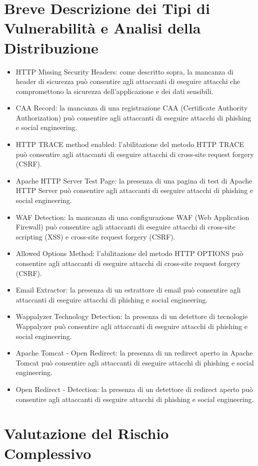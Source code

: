 \section{Breve Descrizione dei Tipi di Vulnerabilità e Analisi della Distribuzione}
\begin{itemize}
\item HTTP Missing Security Headers: come descritto sopra, la mancanza di header di sicurezza può consentire agli attaccanti di eseguire attacchi che compromettono la sicurezza dell'applicazione e dei dati sensibili.
\item CAA Record: la mancanza di una registrazione CAA (Certificate Authority Authorization) può consentire agli attaccanti di eseguire attacchi di phishing e social engineering.
\item HTTP TRACE method enabled: l'abilitazione del metodo HTTP TRACE può consentire agli attaccanti di eseguire attacchi di cross-site request forgery (CSRF).
\item Apache HTTP Server Test Page: la presenza di una pagina di test di Apache HTTP Server può consentire agli attaccanti di eseguire attacchi di phishing e social engineering.
\item WAF Detection: la mancanza di una configurazione WAF (Web Application Firewall) può consentire agli attaccanti di eseguire attacchi di cross-site scripting (XSS) e cross-site request forgery (CSRF).
\item Allowed Options Method: l'abilitazione del metodo HTTP OPTIONS può consentire agli attaccanti di eseguire attacchi di cross-site request forgery (CSRF).
\item Email Extractor: la presenza di un estrattore di email può consentire agli attaccanti di eseguire attacchi di phishing e social engineering.
\item Wappalyzer Technology Detection: la presenza di un detettore di tecnologie Wappalyzer può consentire agli attaccanti di eseguire attacchi di phishing e social engineering.
\item Apache Tomcat - Open Redirect: la presenza di un redirect aperto in Apache Tomcat può consentire agli attaccanti di eseguire attacchi di phishing e social engineering.
\item Open Redirect - Detection: la presenza di un detettore di redirect aperto può consentire agli attaccanti di eseguire attacchi di phishing e social engineering.
\end{itemize}
\section{Valutazione del Rischio Complessivo}

